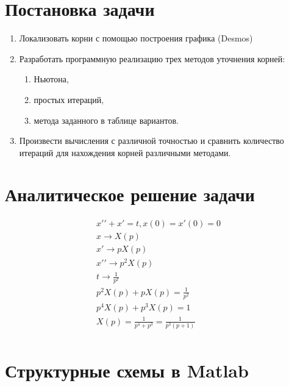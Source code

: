 \documentclass[12pt]{article}
\begin{document}
	\section{Постановка задачи}
	\begin{enumerate} 
		\item Локализовать корни с помощью  построения графика (Desmos)	
		\item Разработать программную реализацию трех методов уточнения корней:
		\begin{enumerate} 
			\item Ньютона,
			\item простых итераций,
			\item метода заданного в таблице вариантов.
		\end{enumerate}
		\item Произвести вычисления с различной точностью и сравнить количество итераций для нахождения корней различными методами.	
	\end{enumerate}
	\newpage  
	
	\section{Аналитическое решение задачи}

		\begin{equation}
			\begin{split}
			
				x\prime \prime +x\prime =t, x(0)=x\prime (0)=0 \\
				x\rightarrow X(p) \\
				x\prime\rightarrow pX(p) \\
				x\prime\prime\rightarrow p^{2}X(p) \\
				t\rightarrow\frac{1}{p^{2}} \\
				p^{2}X(p)+pX(p)=\frac{1}{p^{2}} \\
				p^{4}X(p)+p^{3}X(p)=1 \\
				X(p)=\frac{1}{p^{4}+p^{3}}=\frac{1}{p^{3}(p+1)} \\
			\end{split}
		\end{equation}

	\newpage 
	
	\section{Структурные схемы в Matlab}
	
	\newpage 
	
\end{document}
